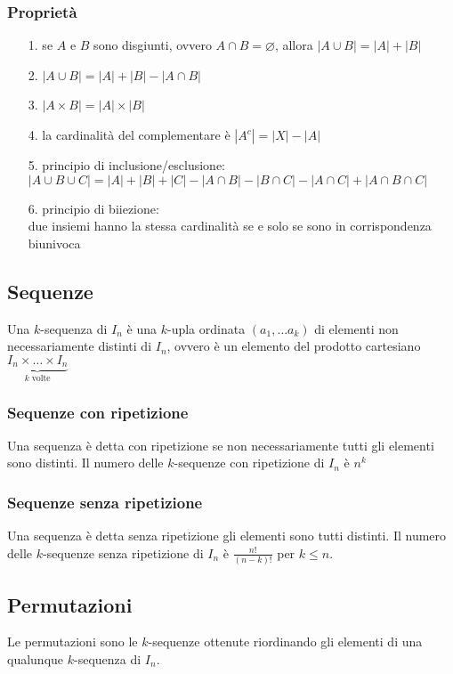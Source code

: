 \documentclass[a4paper]{article}
\begin{document}
\subsubsection*{Proprietà}
\begin{itemize}[topsep=3pt, itemsep=0pt]
	\item[1.] se \(A\) e \(B\) sono disgiunti, ovvero \(A \cap B = \varnothing\), allora \(|A \cup B| = |A| + |B|\)
	\item[2.] \(|A\cup B| = |A| + |B| - |A \cap B|\)
	\item[3.] \(|A \times B| = |A| \times |B|\)
	\item[4.] la cardinalità del complementare è \(|A^c| = |X|-|A|\)
	\item[5.] principio di inclusione/esclusione: \\
	\(|A \cup B \cup C| = |A| + |B| + |C| - |A \cap B| - |B \cap C| - |A \cap C| + |A \cap B \cap C|\)
	\item[6.] principio di biiezione: \\
	due insiemi hanno la stessa cardinalità se e solo se sono in corrispondenza biunivoca
\end{itemize}

\subsection{Sequenze}
Una \(k\)-sequenza di \(I_n\) è una \(k\)-upla ordinata \((a_1, \dots a_k)\) di elementi non necessariamente distinti di \(I_n\),
ovvero è un elemento del prodotto cartesiano \(\underbrace{I_n \times \dots \times I_n}_{k \; \text{volte}}\)

\subsubsection*{Sequenze con ripetizione}
Una sequenza è detta con ripetizione se non necessariamente tutti gli elementi sono distinti. Il numero delle \(k\)-sequenze con
ripetizione di \(I_n\) è \(n^k\)

\subsubsection*{Sequenze senza ripetizione}
Una sequenza è detta senza ripetizione gli elementi sono tutti distinti. Il numero delle \(k\)-sequenze senza ripetizione di \(I_n\)
è \(\displaystyle \frac{n!}{(n-k)!}\) per \(k \leq n\).

\subsection{Permutazioni}
Le permutazioni sono le \(k\)-sequenze ottenute riordinando gli elementi di una qualunque \(k\)-sequenza di \(I_n\).
\end{document}
